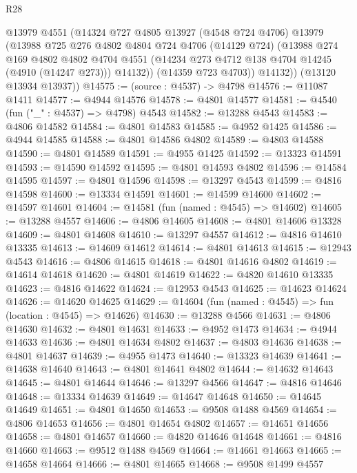 \begin{lexlean}{R28}
\begin{coremodule}
          @13979
          @4551
          (@14324
            @727
            @4805
            @13927
            (@4548 @724 @4706)
            @13979
            (@13988
              @725
              @276
              @4802
              @4804
              @724
              @4706
              (@14129 @724)
              (@13988
                @274
                @169
                @4802
                @4802
                @4704
                @4551
                (@14234 @273 @4712 @138 @4704 @14245 (@4910 (@14247 @273)))
                @14132))
            (@14359 @723 @4703))
          @14132))
      (@13120 @13934 @13937))
@14575 := (source : @4537) -> @4798
@14576 := @11087 @1411
@14577 := @4944 @14576
@14578 := @4801 @14577
@14581 := @4540 (fun ("_" : @4537) => @4798) @4543
@14582 := @13288 @4543
@14583 := @4806 @14582
@14584 := @4801 @14583
@14585 := @4952 @1425
@14586 := @4944 @14585
@14588 := @4801 @14586 @4802
@14589 := @4803 @14588
@14590 := @4801 @14589
@14591 := @4955 @1425
@14592 := @13323 @14591
@14593 := @14590 @14592
@14595 := @4801 @14593 @4802
@14596 := @14584 @14595
@14597 := @4801 @14596
@14598 := @13297 @4543
@14599 := @4816 @14598
@14600 := @13334 @14591
@14601 := @14599 @14600
@14602 := @14597 @14601
@14604 := @14581 (fun (named : @4545) => @14602)
@14605 := @13288 @4557
@14606 := @4806 @14605
@14608 := @4801 @14606 @13328
@14609 := @4801 @14608
@14610 := @13297 @4557
@14612 := @4816 @14610 @13335
@14613 := @14609 @14612
@14614 := @4801 @14613
@14615 := @12943 @4543
@14616 := @4806 @14615
@14618 := @4801 @14616 @4802
@14619 := @14614 @14618
@14620 := @4801 @14619
@14622 := @4820 @14610 @13335
@14623 := @4816 @14622
@14624 := @12953 @4543
@14625 := @14623 @14624
@14626 := @14620 @14625
@14629 := @14604 (fun (named : @4545) => fun (location : @4545) => @14626)
@14630 := @13288 @4566
@14631 := @4806 @14630
@14632 := @4801 @14631
@14633 := @4952 @1473
@14634 := @4944 @14633
@14636 := @4801 @14634 @4802
@14637 := @4803 @14636
@14638 := @4801 @14637
@14639 := @4955 @1473
@14640 := @13323 @14639
@14641 := @14638 @14640
@14643 := @4801 @14641 @4802
@14644 := @14632 @14643
@14645 := @4801 @14644
@14646 := @13297 @4566
@14647 := @4816 @14646
@14648 := @13334 @14639
@14649 := @14647 @14648
@14650 := @14645 @14649
@14651 := @4801 @14650
@14653 := @9508 @1488 @4569
@14654 := @4806 @14653
@14656 := @4801 @14654 @4802
@14657 := @14651 @14656
@14658 := @4801 @14657
@14660 := @4820 @14646 @14648
@14661 := @4816 @14660
@14663 := @9512 @1488 @4569
@14664 := @14661 @14663
@14665 := @14658 @14664
@14666 := @4801 @14665
@14668 := @9508 @1499 @4557

\end{coremodule}
\end{lexlean}
